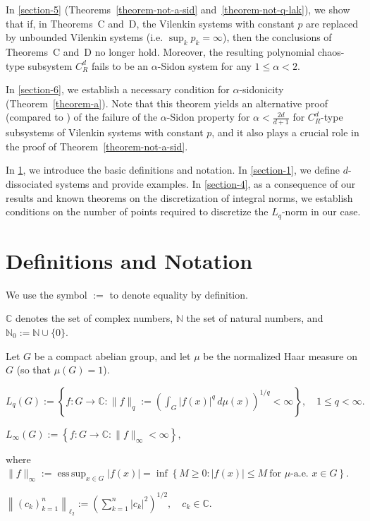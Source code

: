 \documentclass[12pt]{article}
\begin{document}
	
In \ref{section-5} (Theorems~\ref{theorem-not-a-sid} and~\ref{theorem-not-q-lak}), we show that if, in Theorems~C and~D, the Vilenkin systems with constant $p$ are replaced by unbounded Vilenkin systems  (i.e. $\sup_{k} p_k = \infty$), then the conclusions of Theorems~C and~D no longer hold. Moreover, the resulting polynomial chaos-type subsystem $C^d_R$ fails to be an $\alpha$-Sidon system for any $1 \le \alpha < 2$.

In \ref{section-6}, we establish a necessary condition for $\alpha$-sidonicity (Theorem~\ref{theorem-a}). Note that this theorem yields an alternative proof (compared to \cite[Ch.~VII, \S~11]{Blei}) of the failure of the $\alpha$-Sidon property for $\alpha < \frac{2d}{d+1}$ for $C^d_R$-type subsystems of Vilenkin systems with constant $p$, and it also plays a crucial role in the proof of Theorem~\ref{theorem-not-a-sid}.

	In \ref{sec-def}, we introduce the basic definitions and notation. In \ref{section-1}, we define $d$-dissociated systems and provide examples. In \ref{section-4}, as a consequence of our results and known theorems on the discretization of integral norms, we establish conditions on the number of points required to discretize the $L_q$-norm in our case.

\section{Definitions and Notation} \label{sec-def}
We use the symbol $:=$ to denote equality by definition. 

$\mathbb{C}$ denotes the set of complex numbers, $\mathbb{N}$ the set of natural numbers, and $\mathbb{N}_0 := \mathbb{N} \cup \{ 0 \}$. 

Let $G$ be a compact abelian group, and let $\mu$ be the normalized Haar measure on $G$ (so that $\mu(G) = 1$).

$L_q(G) := \left\{ 
f \colon G \to \mathbb{C} \colon 
\|f\|_q := \left( \int_G |f(x)|^q \, d\mu(x) \right)^{1/q} < \infty 
\right\}, \quad 1 \le q < \infty.$

$L_\infty(G) := \left\{ 
f \colon G \to \mathbb{C} \colon 
\|f\|_\infty < \infty 
\right\},$

where $\|f\|_\infty := \operatorname{ess\,sup}_{x \in G} |f(x)| 
= \inf \left\{ M \ge 0 : |f(x)| \le M \ \text{for $\mu$-a.e. } x \in G \right\}$.

$\left\| ( c_k )_{k=1}^n \right\|_{\ell_2} 
:= \left( \sum_{k=1}^n | c_k |^2 \right)^{1/2}, \quad c_k \in \mathbb{C}$. 
\end{document}
